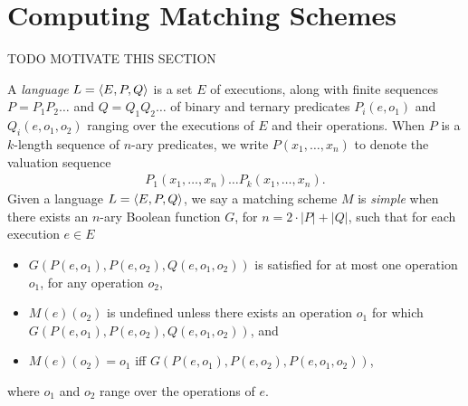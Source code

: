 \section{Computing Matching Schemes}
\label{sec:matching}

TODO MOTIVATE THIS SECTION

A \emph{language} $L = {\left\langle{E,P,Q}\right\rangle}$ is a set $E$ of executions, along with
finite sequences $P = P_1 P_2 \ldots$ and $Q = Q_1 Q_2 \ldots$ of binary and
ternary predicates $P_i(e,o_1)$ and $Q_i(e,o_1,o_2)$ ranging over the
executions of $E$ and their operations. When $P$ is a $k$-length sequence of
$n$-ary predicates, we write $P(x_1, \ldots, x_n)$ to denote the valuation
sequence
\begin{align*}
  P_1(x_1, \ldots, x_n) \ldots P_k(x_1, \ldots, x_n).
\end{align*}
Given a language $L = {\left\langle{E,P,Q}\right\rangle}$, we say a matching scheme $M$ is
\emph{simple} when there exists an $n$-ary Boolean function $G$, for $n =
2\cdot|P|+|Q|$, such that for each execution $e \in E$
\begin{itemize}

  \item $G(P(e,o_1),P(e,o_2),Q(e,o_1,o_2))$ is satisfied for at most one
  operation $o_1$, for any operation $o_2$,

  \item $M(e)(o_2)$ is undefined unless there exists an operation $o_1$
  for which $G(P(e,o_1),P(e,o_2),Q(e,o_1,o_2))$, and

  \item $M(e)(o_2) = o_1$ if{f} $G(P(e,o_1),P(e,o_2),P(e,o_1,o_2))$,

\end{itemize}
where $o_1$ and $o_2$ range over the operations of $e$.

